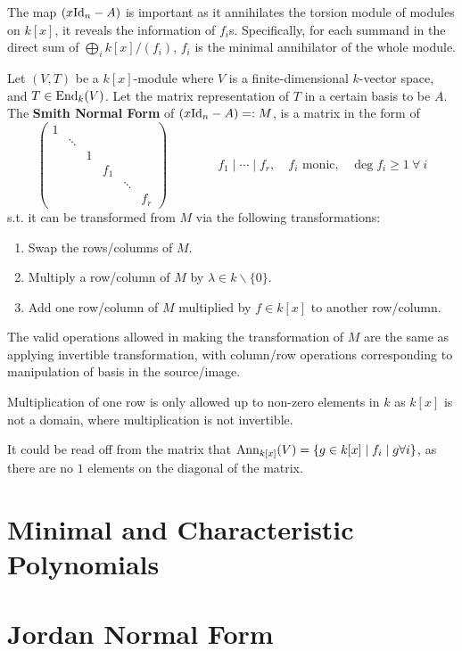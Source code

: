 \documentclass{article}
\begin{document}
The map $(x\mathrm{Id}_n - A)$ is important as it annihilates the torsion module of modules on $k[x]$, it reveals the information of $f_i$s. Specifically, for each summand in the direct sum of $\bigoplus_i k[x]/(f_i)$, $f_i$ is the minimal annihilator of the whole module. 

\begin{definition}
    Let $(V, T)$ be a $k[x]$-module where $V$ is a finite-dimensional $k$-vector space, and $T\in \mathrm{End}_k(V)$. Let the matrix representation of $T$ in a certain basis to be $A$. The \textbf{Smith Normal Form} of $(x\mathrm{Id}_n - A) =: M$, is a matrix in the form of
    \[
        \left(\begin{smallmatrix}
            1 & & & & & \\[0pt]
            & \ddots & & & & \\[0pt]
            & & 1 & & & \\[0pt]
            & & & f_1 & & \\[0pt]
            & & & & \ddots & \\[0pt]
            & & & & & f_r
        \end{smallmatrix}\right) \qquad \qquad f_1\mid \cdots \mid f_r,\quad f_i \text{ monic,}\quad \deg f_i \geq 1\ \forall\ i
    \]
    s.t. it can be transformed from $M$ via the following transformations:
    \begin{enumerate}
        \item Swap the rows/columns of $M$.
        \item Multiply a row/column of $M$ by $\lambda \in k\smallsetminus \{0\}$.
        \item Add one row/column of $M$ multiplied by $f \in k[x]$ to another row/column.
    \end{enumerate}
\end{definition}

\begin{remark}
    The valid operations allowed in making the transformation of $M$ are the same as applying invertible transformation, with column/row operations corresponding to manipulation of basis in the source/image.

    Multiplication of one row is only allowed up to non-zero elements in $k$ as $k[x]$ is not a domain, where multiplication is not invertible.
\end{remark}

\begin{remark}
    It could be read off from the matrix that $\mathrm{Ann}_{k[x]}(V) = \{g \in k[x] \mid f_i \mid g \forall i\}$, as there are no $1$ elements on the diagonal of the matrix.  
\end{remark}

\section{Minimal and Characteristic Polynomials}

\section{Jordan Normal Form}
    
\end{document}
